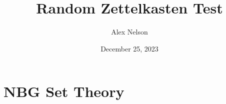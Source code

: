 \documentclass{article}
\title{Random Zettelkasten Test}
\author{Alex Nelson}
\date{December 25, 2023}
\begin{document}
\maketitle


\section{NBG Set Theory}




\end{document}
